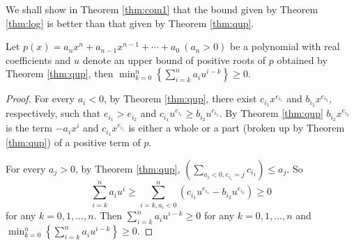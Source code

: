 

We shall show in Theorem \ref{thm:com1} that the bound given by Theorem \ref{thm:log} is better than that given by Theorem \ref{thm:qup}.








\begin{theorem}\label{thm:com}
	Let $p(x)=a_nx^n+a_{n-1}x^{n-1}+\cdots+a_0\ (a_n>0)$ be a polynomial with real coefficients and   $u$ denote an upper bound of positive roots of $p$ obtained by Theorem \ref{thm:qup}, then $\min_{k=0}^{n}\left\{  \sum_{i=k}^n a_i u^{i-k}\right\}\ge0$.
	
\end{theorem}

\begin{proof}
	
	For every $ a_i<0$, by Theorem \ref{thm:qup}, there exist  $c_{i_1}x^{e_{i_1}}$ and $b_{i_2}x^{e_{i_2}},$  respectively, such that
	$e_{i_1}>e_{i_2}$ and $c_{i_1}u^{e_{i_1}}\ge b_{i_2}u^{e_{i_2}}$. By  Theorem \ref{thm:qup} $b_{i_2}x^{e_{i_2} }$ is the term $-a_ix^i$
	and $c_{i_1}x^{e_{i_1} }$ is either a whole or a part (broken up by Theorem \ref{thm:qup}) of a positive term of $p$.
	
	For every  $a_j>0$, by Theorem \ref{thm:qup}, $\left( \sum_{a_i<0,e_{i_1}=j }c_{i_1} \right)\le a_{j}$. So \begin{dmath*}\sum_{i=k}^na_iu^i\ge \sum_{i=k,a_i<0}^n \left( c_{i_1}u^{e_{i_1}}-
		b_{i_2}u^{e_{i_2}} \right)\ge 0 \end{dmath*} for any $k= 0,1,\ldots,n$. Then $\sum_{i=k}^n a_i u^{i-k}\ge0 $ for any  $k= 0,1,\ldots,n$ and
	$\min_{k=0}^{n}\left\{  \sum_{i=k}^n a_i u^{i-k}\right\}\ge0$.
\end{proof}

